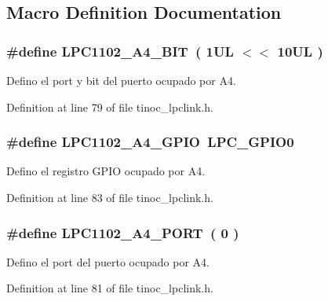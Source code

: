 \subsection{Macro Definition Documentation}
\subsubsection[{\texorpdfstring{L\+P\+C1102\+\_\+\+A4\+\_\+\+B\+IT}{LPC1102_A4_BIT}}]{\setlength{\rightskip}{0pt plus 5cm}\#define L\+P\+C1102\+\_\+\+A4\+\_\+\+B\+IT~( 1\+U\+L $<$$<$ 10\+U\+L )}\hypertarget{group___p_i_n_a4_ga23798f2c62b59f2710bbea33952bfcc8}{}\label{group___p_i_n_a4_ga23798f2c62b59f2710bbea33952bfcc8}


Defino el port y bit del puerto ocupado por A4. 



Definition at line 79 of file tinoc\+\_\+lpclink.\+h.

\subsubsection[{\texorpdfstring{L\+P\+C1102\+\_\+\+A4\+\_\+\+G\+P\+IO}{LPC1102_A4_GPIO}}]{\setlength{\rightskip}{0pt plus 5cm}\#define L\+P\+C1102\+\_\+\+A4\+\_\+\+G\+P\+IO~L\+P\+C\+\_\+\+G\+P\+I\+O0}\hypertarget{group___p_i_n_a4_ga958d137c3a737689f2158ceae5f0c7b1}{}\label{group___p_i_n_a4_ga958d137c3a737689f2158ceae5f0c7b1}


Defino el registro G\+P\+IO ocupado por A4. 



Definition at line 83 of file tinoc\+\_\+lpclink.\+h.

\subsubsection[{\texorpdfstring{L\+P\+C1102\+\_\+\+A4\+\_\+\+P\+O\+RT}{LPC1102_A4_PORT}}]{\setlength{\rightskip}{0pt plus 5cm}\#define L\+P\+C1102\+\_\+\+A4\+\_\+\+P\+O\+RT~( 0 )}\hypertarget{group___p_i_n_a4_ga03e8289e4ef7c73d23799d95329c4d81}{}\label{group___p_i_n_a4_ga03e8289e4ef7c73d23799d95329c4d81}


Defino el port del puerto ocupado por A4. 



Definition at line 81 of file tinoc\+\_\+lpclink.\+h.


